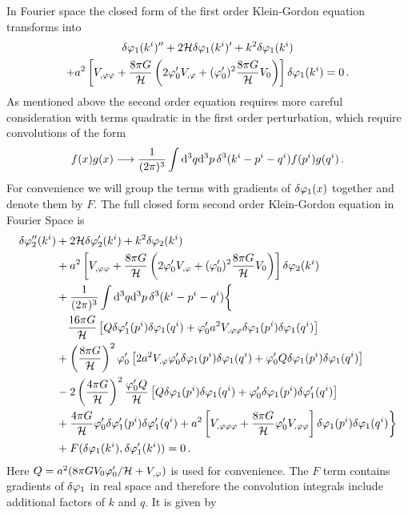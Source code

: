 In Fourier space the closed form of the first order Klein-Gordon equation
transforms into
%
\begin{multline}
\label{eq:fokg}
 \delta\varphi_{1}(k^i)'' + 2\mathcal{H} \delta\varphi_{1}(k^i)' + k^2\delta\varphi_{1}(k^i) \\
+ a^2 \left[V_{,\varphi\varphi} +
\frac{8\pi G}{\mathcal{H}}\left(2\varphi_{0}' V_{,\varphi} + (\varphi_{0}')^2\frac{8\pi G
}{\mathcal{H}}V_{0}\right)\right]\delta\varphi_{1}(k^i) = 0 \,.
\end{multline}
%
As mentioned above the second order equation requires more careful
consideration with terms quadratic in the first order perturbation, which
require convolutions of the form
%
\begin{equation}
 f(x)g(x) \longrightarrow \frac{1}{(2 \pi)^3} \int \mathrm{d}^3q \mathrm{d}^3p\, \delta^3(k^i
-p^i -q^i) f(p^i)
g(q^i) \,.
\end{equation}
%
For convenience we will group the terms with gradients of $\delta\varphi_{1}(x)$
together and denote them by $F$. 
The full closed form second order Klein-Gordon
equation in Fourier Space is \cite{Malik:2006ir}
%  
\begin{align}
\label{eq:SOKG-real-num}
\dvp2''(\kvi) &+ 2\H \dvp2'(\kvi) + k^2 \dvp2(\kvi) \nonumber \\
%
&+ a^2\left[\Upp + \frac{8\pi G}{\H}\left(2\vp_{0}'\Uphi
+ (\vp_0')^2\frac{8\pi G}{\H}\U \right) \right]\dvp2(\kvi) \nonumber \\
% 
&+ \frac{1}{(2\pi)^3}\int \d^3q \d^3p\, \delta^3(\kvi -\pvi -\qvi) \biggl\{
\biggr.\nonumber\\
&\quad \frac{16\pi G}{\H} \left[ Q \dvp1'(\pvi) \dvp1(\qvi) + \vp_{0}' a^2\Upp
\dvp1(\pvi)\dvp1(\qvi) \right]  \nonumber \\
%
&+ \left(\frac{8\pi G}{\H}\right)^2\vp_{0}'\left[2a^2\Uphi\vp_{0}'
\dvp1(\pvi)\dvp1(\qvi) + \vp_{0}'Q\dvp1(\pvi)\dvp1(\qvi) \right]
\nonumber \\
%
&- 2\left(\frac{4\pi G}{\H}\right)^2\frac{\vp_{0}' Q}{\H} \left[Q\dvp1(\pvi)
\dvp1(\qvi) +
\vp_{0}' \dvp1(\pvi) \dvp1'(\qvi)\right] \nonumber \\
%
\biggl. &+ \frac{4\pi G}{\H} \vp_{0}' \dvp1'(\pvi) \dvp1'(\qvi) 
 + a^2\left[\Uppp + \frac{8\pi G}{\H}\vp_{0}' \Upp\right] \dvp1(\pvi)
\dvp1(\qvi) \biggr\} \nonumber \\
&+ F(\dvp1(\kvi), \dvp1'(\kvi)) = 0\,.
\end{align}
%
Here $Q=a^2 (8\pi G V_{0} \varphi_0'/\mathcal{H} + V_{,\varphi})$ is used for convenience.
The $F$ term contains gradients of $\delta\varphi_{1}$ in real space and therefore
the convolution integrals include additional factors of $k$ and
$q$. It is given by \cite{Malik:2006ir}
